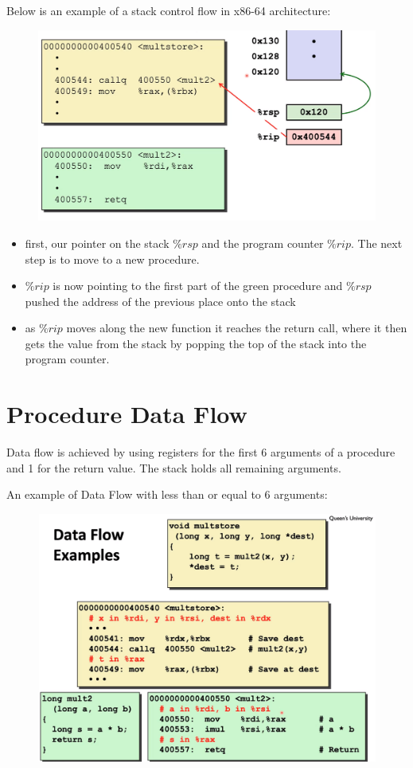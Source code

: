 \documentclass[12pt]{book}
\begin{document}
Below is an example of a stack control flow in x86-64 architecture:
\begin{figure}[h]
        \centering
        \includegraphics[scale = 0.3]{./figures/controlflowEx}
\end{figure}
\begin{itemize}
        \item first, our pointer on the stack $\%rsp$ and the program counter  $\%rip$. The next step is to move to 
                a new procedure.
        \item $\%rip$ is now pointing to the first part of the green procedure and  $\%rsp$ pushed the address
                of the previous place onto the stack
        \item as  $\%rip$ moves along the new function it reaches the return call, where it then gets the value from the
                stack by popping the top of the stack into the program counter.
\end{itemize}
\pagebreak


\section*{Procedure Data Flow}
Data flow is achieved by using registers for the first 6 arguments of a procedure
and 1 for the return value. The stack holds all remaining 
arguments.

An example of Data Flow with less than or equal to 6 arguments:
\begin{figure}[h]
        \centering
        \includegraphics[scale = 0.2]{./figures/dataflowEx}
\end{figure}
\end{document}
